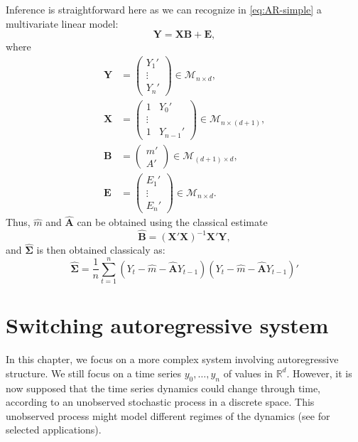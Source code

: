 \documentclass[
]{book}
\begin{document}
Inference is straightforward here as we can recognize in \eqref{eq:AR-simple} a multivariate linear model:
\[\mathbf{Y} = \mathbf{XB} + \mathbf{E},\]
where
\begin{align*}
\mathbf{Y} &=
\begin{pmatrix}
Y_1'\\
\vdots\\
Y_n'
\end{pmatrix} \in \mathcal{M}_{n \times d},\\
\mathbf{X} &=
\begin{pmatrix}
1 & Y_0'\\
\vdots\\
1 & Y_{n-1}'
\end{pmatrix} \in \mathcal{M}_{n \times (d+1)},\\
\mathbf{B} &=
\begin{pmatrix}
m'\\
A'
\end{pmatrix} \in \mathcal{M}_{(d + 1) \times d},\\
\mathbf{E} &=
\begin{pmatrix}
E_1'\\
\vdots\\
E_n'
\end{pmatrix} \in \mathcal{M}_{n \times d}.
\end{align*}
Thus, \(\hat{m}\) and \(\hat{\mathbf{A}}\) can be obtained using the classical estimate
\begin{equation}
\hat{\mathbf{B}} = \left(\mathbf{X'X}\right)^{-1}\mathbf{X}'\mathbf{Y}, \label{eq:AR-simple-B-hat}
\end{equation}
and \(\hat{\mathbf{\Sigma}}\) is then obtained classicaly as:
\begin{equation}
\hat{\mathbf{\Sigma}} = \frac{1}{n} \sum_{t = 1}^n \left(Y_t - \hat{m} - \hat{\mathbf{A}} Y_{t - 1}\right) \left(Y_t - \hat{m} - \hat{\mathbf{A}} Y_{t - 1}\right)' \label{eq:AR-simple-Sigma-hat}
\end{equation}

\hypertarget{switching-autoregressive-system}{%
\chapter{Switching autoregressive system}\label{switching-autoregressive-system}}

In this chapter, we focus on a more complex system involving autoregressive structure.
We still focus on a time series \(y_0, \dots, y_n\) of values in \(\mathbb{R}^d\). However, it is now supposed that the time series dynamics could change through time, according to an unobserved stochastic process in a discrete space.
This unobserved process might model different regimes of the dynamics (see \citet{rabiner1989tutorial} for selected applications).
\end{document}
